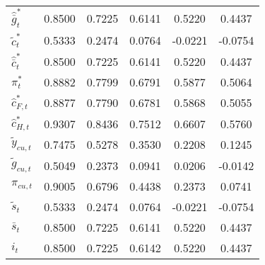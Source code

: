 \begin{center}
\begin{longtable}{lccccc}
${\hat {\bar g}_t^*}  $	 & 	    0.8500	 & 	    0.7225	 & 	    0.6141	 & 	    0.5220	 & 	    0.4437 \\ 
${\tilde c_t^*}       $	 & 	    0.5333	 & 	    0.2474	 & 	    0.0764	 & 	   -0.0221	 & 	   -0.0754 \\ 
${\hat {\bar c}_t^*}  $	 & 	    0.8500	 & 	    0.7225	 & 	    0.6141	 & 	    0.5220	 & 	    0.4437 \\ 
${\pi_t^*}            $	 & 	    0.8882	 & 	    0.7799	 & 	    0.6791	 & 	    0.5877	 & 	    0.5064 \\ 
${\hat c_{F,t}^*}     $	 & 	    0.8877	 & 	    0.7790	 & 	    0.6781	 & 	    0.5868	 & 	    0.5055 \\ 
${\hat c_{H,t}^*}     $	 & 	    0.9307	 & 	    0.8436	 & 	    0.7512	 & 	    0.6607	 & 	    0.5760 \\ 
${\tilde y_{cu,t}}    $	 & 	    0.7475	 & 	    0.5278	 & 	    0.3530	 & 	    0.2208	 & 	    0.1245 \\ 
${\tilde g_{cu,t}}    $	 & 	    0.5049	 & 	    0.2373	 & 	    0.0941	 & 	    0.0206	 & 	   -0.0142 \\ 
${\pi_{cu,t}}         $	 & 	    0.9005	 & 	    0.6796	 & 	    0.4438	 & 	    0.2373	 & 	    0.0741 \\ 
${\tilde s_t}         $	 & 	    0.5333	 & 	    0.2474	 & 	    0.0764	 & 	   -0.0221	 & 	   -0.0754 \\ 
${\bar s_t}           $	 & 	    0.8500	 & 	    0.7225	 & 	    0.6141	 & 	    0.5220	 & 	    0.4437 \\ 
${i_t}                $	 & 	    0.8500	 & 	    0.7225	 & 	    0.6142	 & 	    0.5220	 & 	    0.4437 \\ 
\end{longtable}
 \end{center}
